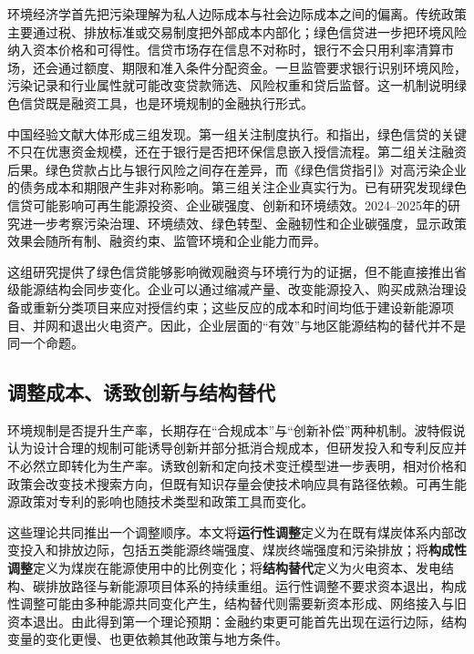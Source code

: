 \documentclass[UTF8,12pt]{ctexart}
\begin{document}
环境经济学首先把污染理解为私人边际成本与社会边际成本之间的偏离\parencite{pigou1920}。传统政策主要通过税、排放标准或交易制度把外部成本内部化；绿色信贷进一步把环境风险纳入资本价格和可得性。信贷市场存在信息不对称时，银行不会只用利率清算市场，还会通过额度、期限和准入条件分配资金\parencite{stiglitzweiss1981}。一旦监管要求银行识别环境风险，污染记录和行业属性就可能改变贷款筛选、风险权重和贷后监督。这一机制说明绿色信贷既是融资工具，也是环境规制的金融执行形式\parencite{campiglio2016,dikauvolz2021}。

中国经验文献大体形成三组发现。第一组关注制度执行。\textcite{aizawayang2010}和\textcite{zhangyangbi2011}指出，绿色信贷的关键不只在优惠资金规模，还在于银行是否把环保信息嵌入授信流程。第二组关注融资后果。绿色贷款占比与银行风险之间存在差异\parencite{cuietal2018}，而《绿色信贷指引》对高污染企业的债务成本和期限产生非对称影响\parencite{xuli2020}。第三组关注企业真实行为。已有研究发现绿色信贷可能影响可再生能源投资、企业碳强度、创新和环境绩效\parencite{heetal2019,xuyetal2023,wuetal2023}。2024--2025年的研究进一步考察污染治理、环境绩效、绿色转型、金融韧性和企业碳强度，显示政策效果会随所有制、融资约束、监管环境和企业能力而异\parencite{zhangetal2024green,laietal2024,lietal2024,pengetal2024,machen2025,zhengetal2025,zhangetal2025micro}。

这组研究提供了绿色信贷能够影响微观融资与环境行为的证据，但不能直接推出省级能源结构会同步变化。企业可以通过缩减产量、改变能源投入、购买成熟治理设备或重新分类项目来应对授信约束；这些反应的成本和时间均低于建设新能源项目、并网和退出火电资产。因此，企业层面的“有效”与地区能源结构的替代并不是同一个命题。

\subsection{调整成本、诱致创新与结构替代}

环境规制是否提升生产率，长期存在“合规成本”与“创新补偿”两种机制。波特假说认为设计合理的规制可能诱导创新并部分抵消合规成本\parencite{portervanderlinde1995}，但研发投入和专利反应并不必然立即转化为生产率\parencite{jaffepalmer1997}。诱致创新和定向技术变迁模型进一步表明，相对价格和政策会改变技术搜索方向，但既有知识存量会使技术响应具有路径依赖\parencite{popp2002,acemogluetal2012,aghionetal2016}。可再生能源政策对专利的影响也随技术类型和政策工具而变化\parencite{johnstoneetal2010}。

这些理论共同推出一个调整顺序。本文将\textbf{运行性调整}定义为在既有煤炭体系内部改变投入和排放边际，包括五类能源终端强度、煤炭终端强度和污染排放；将\textbf{构成性调整}定义为煤炭在能源使用中的比例变化；将\textbf{结构替代}定义为火电资本、发电结构、碳排放路径与新能源项目体系的持续重组。运行性调整不要求资本退出，构成性调整可能由多种能源共同变化产生，结构替代则需要新资本形成、网络接入与旧资本退出。由此得到第一个理论预期：金融约束更可能首先出现在运行边际，结构变量的变化更慢、也更依赖其他政策与地方条件。
\end{document}
